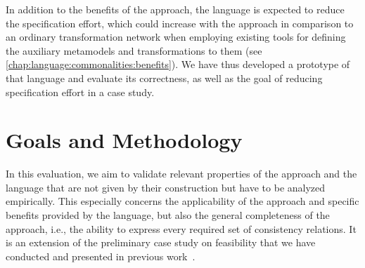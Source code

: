 In addition to the benefits of the \commonalities approach, the \commonalities language is expected to reduce the specification effort, which could increase with the \commonalities approach in comparison to an ordinary transformation network when employing existing tools for defining the auxiliary metamodels and transformations to them (see \autoref{chap:language:commonalities:benefits}).
We have thus developed a prototype of that language and evaluate its correctness, as well as the goal of reducing specification effort in a case study.


\section{Goals and Methodology}

In this evaluation, we aim to validate relevant properties of the \commonalities approach and the \commonalities language that are not given by their construction but have to be analyzed empirically.
This especially concerns the applicability of the approach and specific benefits provided by the language, but also the general completeness of the approach, i.e., the ability to express every required set of consistency relations.
It is an extension of the preliminary case study on feasibility that we have conducted and presented in previous work~.

